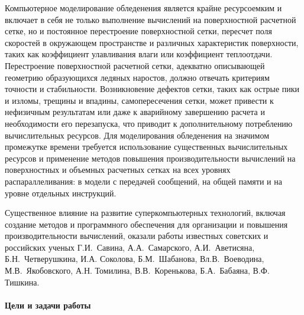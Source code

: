 Компьютерное моделирование обледенения является крайне ресурсоемким и включает в себя не только выполнение вычислений на поверхностной расчетной сетке, но и постоянное перестроение поверхностной сетки, пересчет поля скоростей в окружающем пространстве и различных характеристик поверхности, таких как коэффициент улавливания влаги или коэффициент теплоотдачи.
Перестроение поверхностной расчетной сетки, адекватно описывающей геометрию образующихся ледяных наростов, должно отвечать критериям точности и стабильности.
Возникновение дефектов сетки, таких как острые пики и изломы, трещины и впадины, самопересечения сетки, может привести к нефизичным результатам или даже к аварийному завершению расчета и необходимости его перезапуска, что приводит к дополнительному потреблению вычислительных ресурсов. 
Для моделирования обледенения на значимом промежутке времени требуется использование существенных вычислительных ресурсов и применение методов повышения производительности вычислений на поверхностных и объемных расчетных сетках на всех уровнях распараллеливания: в модели с передачей сообщений, на общей памяти и на уровне отдельных инструкций.

Существенное влияние на развитие суперкомпьютерных технологий, включая создание методов и программного обеспечения для организации и повышения производительности вычислений, оказали работы известных советских и российских ученых Г.И.~Савина, А.А.~Самарского, А.И.~Аветисяна, Б.Н.~Четверушкина, И.А. Соколова, Б.М.~Шабанова, Вл.В.~Воеводина, М.В.~Якобовского, А.Н. Томилина, В.В.~Коренькова, Б.А.~Бабаяна, В.Ф. Тишкина. 

\paragraph{Цели и задачи работы} \


























